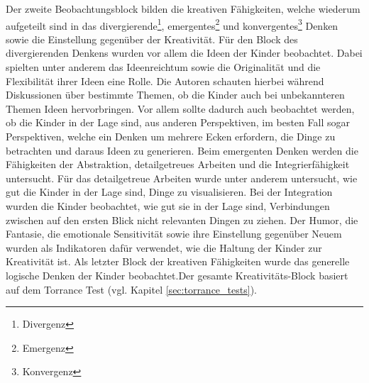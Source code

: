 	Der zweite Beobachtungsblock bilden die kreativen Fähigkeiten, welche wiederum aufgeteilt sind in das divergierende\footnote{\gls{Divergenz}}, emergentes\footnote{\gls{Emergenz}} und konvergentes\footnote{\gls{Konvergenz}} Denken sowie die Einstellung gegenüber der Kreativität. Für den Block des divergierenden Denkens wurden vor allem die Ideen der Kinder beobachtet. Dabei spielten unter anderem das Ideenreichtum sowie die Originalität und die Flexibilität ihrer Ideen eine Rolle. Die Autoren schauten hierbei während Diskussionen über bestimmte Themen, ob die Kinder auch bei unbekannteren Themen Ideen hervorbringen. Vor allem sollte dadurch auch beobachtet werden, ob die Kinder in der Lage sind, aus anderen Perspektiven, im besten Fall sogar Perspektiven, welche ein Denken um mehrere Ecken erfordern, die Dinge zu betrachten und daraus Ideen zu generieren. Beim emergenten  Denken werden die Fähigkeiten der Abstraktion, detailgetreues Arbeiten und die Integrierfähigkeit untersucht. Für das detailgetreue Arbeiten wurde unter anderem untersucht, wie gut die Kinder in der Lage sind, Dinge zu visualisieren. Bei der Integration wurden die Kinder beobachtet, wie gut sie in der Lage sind, Verbindungen zwischen auf den ersten Blick nicht relevanten Dingen zu ziehen. Der Humor, die Fantasie, die emotionale Sensitivität sowie ihre Einstellung gegenüber Neuem wurden als Indikatoren dafür verwendet, wie die Haltung der Kinder zur Kreativität ist. Als letzter Block der kreativen Fähigkeiten wurde das generelle logische Denken der Kinder beobachtet.Der gesamte Kreativitäts-Block basiert auf dem Torrance Test (vgl. Kapitel \ref{sec:torrance_tests}).
	
